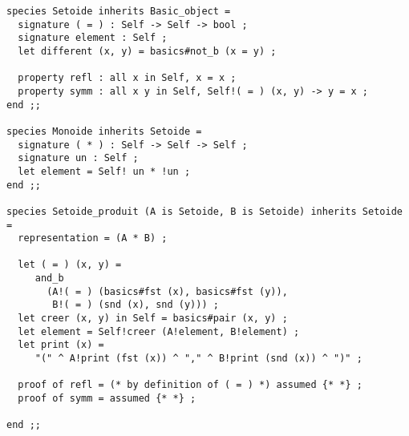 {\footnotesize
\begin{lstlisting}
species Setoide inherits Basic_object =
  signature ( = ) : Self -> Self -> bool ;
  signature element : Self ;
  let different (x, y) = basics#not_b (x = y) ;

  property refl : all x in Self, x = x ;
  property symm : all x y in Self, Self!( = ) (x, y) -> y = x ;
end ;;

species Monoide inherits Setoide =
  signature ( * ) : Self -> Self -> Self ;
  signature un : Self ;
  let element = Self! un * !un ;
end ;;

species Setoide_produit (A is Setoide, B is Setoide) inherits Setoide =
  representation = (A * B) ;

  let ( = ) (x, y) =
     and_b
       (A!( = ) (basics#fst (x), basics#fst (y)),
        B!( = ) (snd (x), snd (y))) ;
  let creer (x, y) in Self = basics#pair (x, y) ;
  let element = Self!creer (A!element, B!element) ;
  let print (x) =
     "(" ^ A!print (fst (x)) ^ "," ^ B!print (snd (x)) ^ ")" ;

  proof of refl = (* by definition of ( = ) *) assumed {* *} ;
  proof of symm = assumed {* *} ;

end ;;
\end{lstlisting}
}


